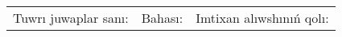 \documentclass{article}
\begin{document}
\vspace{1cm}

\begin{tabular}{lll}
Tuwrı juwaplar sanı: \underline{\hspace{1.5cm}} & 
Bahası: \underline{\hspace{1.5cm}} & 
Imtixan alıwshınıń qolı: \underline{\hspace{2cm}} \\
\end{tabular}

\egroup

\newpage
\end{document}
